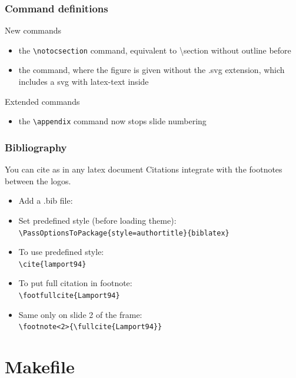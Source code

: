 \documentclass[aspectratio=169,c,12pt]{beamer}
\begin{document}
\begin{frame}[fragile]
	\frametitle{Command definitions}
	\begin{block}{New commands}
		\begin{itemize}
			\item the \verb|\notocsection| command, equivalent to \textbackslash section without outline before
			\item the \verb|| command, where the figure is given without the .svg extension, which includes a svg with latex-text inside
		\end{itemize}
	\end{block}
	\pause
	\begin{block}{Extended commands}
		\begin{itemize}
			\item the \verb|\appendix| command now stops slide numbering
		\end{itemize}
	\end{block}
\end{frame}

\begin{frame}[fragile]
	\frametitle{Bibliography}
	\begin{block}{You can cite as in any latex document}
		Citations integrate with the footnotes between the logos.
		\begin{itemize}
			\item Add a .bib file: \\ \verb||
			\item Set predefined style (before loading theme): \\ \verb|\PassOptionsToPackage{style=authortitle}{biblatex}|
			\item To use predefined style: \\ \verb|\cite{lamport94}|
			\item To put full citation in footnote: \\ \verb|\footfullcite{Lamport94}|
			\item Same only on slide 2 of the frame: \\ \verb|\footnote<2>{\fullcite{Lamport94}}|
		\end{itemize}
	\end{block}
\end{frame}

\section{Makefile}
\end{document}
